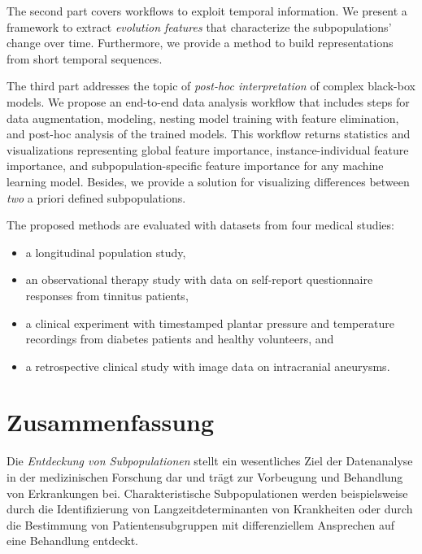 \documentclass[
  oneside]{book}
\providecommand{\tightlist}{%
  \setlength{\itemsep}{0pt}\setlength{\parskip}{0pt}}
\begin{document}
The second part covers workflows to exploit temporal information.
We present a framework to extract \emph{evolution features} that characterize the subpopulations' change over time.
Furthermore, we provide a method to build representations from short temporal sequences.

The third part addresses the topic of \emph{post-hoc interpretation} of complex black-box models.
We propose an end-to-end data analysis workflow that includes steps for data augmentation, modeling, nesting model training with feature elimination, and post-hoc analysis of the trained models.
This workflow returns statistics and visualizations representing global feature importance, instance-individual feature importance, and subpopulation-specific feature importance for any machine learning model.
Besides, we provide a solution for visualizing differences between \emph{two} a priori defined subpopulations.

The proposed methods are evaluated with datasets from four medical studies:

\begin{itemize}
\tightlist
\item
  a longitudinal population study,
\item
  an observational therapy study with data on self-report questionnaire responses from tinnitus patients,
\item
  a clinical experiment with timestamped plantar pressure and temperature recordings from diabetes patients and healthy volunteers, and
\item
  a retrospective clinical study with image data on intracranial aneurysms.
\end{itemize}

\hypertarget{zusammenfassung}{%
\section*{Zusammenfassung}\label{zusammenfassung}}

Die \emph{Entdeckung von Subpopulationen} stellt ein wesentliches Ziel der Datenanalyse in der medizinischen Forschung dar und trägt zur Vorbeugung und Behandlung von Erkrankungen bei.
Charakteristische Subpopulationen werden beispielsweise durch die Identifizierung von Langzeitdeterminanten von Krankheiten oder durch die Bestimmung von Patientensubgruppen mit differenziellem Ansprechen auf eine Behandlung entdeckt.
\end{document}
